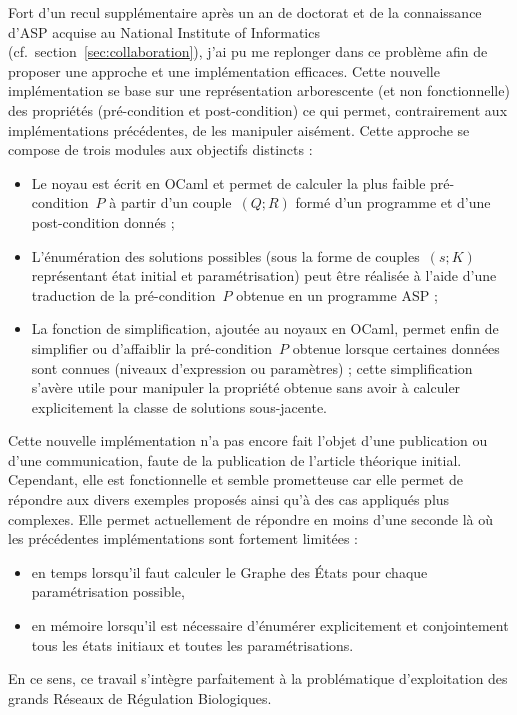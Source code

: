 Fort d'un recul supplémentaire après un an de doctorat et de la connaissance d'ASP acquise au National Institute of Informatics (cf.~section~\ref{sec:collaboration}), j'ai pu me replonger dans ce problème afin de proposer une approche et une implémentation efficaces.
Cette nouvelle implémentation se base sur une représentation arborescente (et non fonctionnelle) des propriétés (pré-condition et post-condition) ce qui permet, contrairement aux implémentations précédentes, de les manipuler aisément.
Cette approche se compose de trois modules aux objectifs distincts :
\begin{itemize}
  \item Le noyau est écrit en OCaml et permet de calculer la plus faible pré-condition~$P$ à partir d'un couple~$(Q ; R)$ formé d'un programme et d'une post-condition donnés ;
  \item L'énumération des solutions possibles (sous la forme de couples~$(s ; K)$ représentant état initial et paramétrisation) peut être réalisée à l'aide d'une traduction de la pré-condition~$P$ obtenue en un programme ASP ;
  \item La fonction de simplification, ajoutée au noyaux en OCaml, permet enfin de simplifier ou d'affaiblir la pré-condition~$P$ obtenue lorsque certaines données sont connues (niveaux d'expression ou paramètres) ; cette simplification s'avère utile pour manipuler la propriété obtenue sans avoir à calculer explicitement la classe de solutions sous-jacente.
\end{itemize}

Cette nouvelle implémentation n'a pas encore fait l'objet d'une publication ou d'une communication, faute de la publication de l'article théorique initial.
Cependant, elle est fonctionnelle et semble prometteuse car elle permet de répondre aux divers exemples proposés ainsi qu'à des cas appliqués plus complexes.
Elle permet actuellement de répondre en moins d'une seconde  là où les précédentes implémentations sont fortement limitées :
\begin{itemize}
  \item en temps lorsqu'il faut calculer le Graphe des États pour chaque paramétrisation possible,
  \item en mémoire lorsqu'il est nécessaire d'énumérer explicitement et conjointement tous les états initiaux et toutes les paramétrisations.
\end{itemize}
En ce sens, ce travail s'intègre parfaitement à la problématique d'exploitation des grands Réseaux de Régulation Biologiques.



